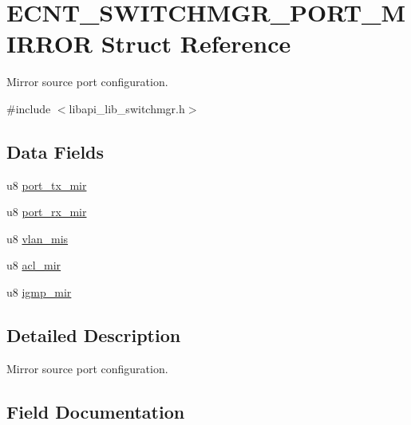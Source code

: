 \hypertarget{structECNT__SWITCHMGR__PORT__MIRROR}{}\section{E\+C\+N\+T\+\_\+\+S\+W\+I\+T\+C\+H\+M\+G\+R\+\_\+\+P\+O\+R\+T\+\_\+\+M\+I\+R\+R\+OR Struct Reference}
\label{structECNT__SWITCHMGR__PORT__MIRROR}


Mirror source port configuration.  




{\ttfamily \#include $<$libapi\+\_\+lib\+\_\+switchmgr.\+h$>$}

\subsection*{Data Fields}
\begin{DoxyCompactItemize}
\item 
u8 \hyperlink{structECNT__SWITCHMGR__PORT__MIRROR_a8ba7e1b38384e254dbbcdc5395e916a3}{port\+\_\+tx\+\_\+mir}
\item 
u8 \hyperlink{structECNT__SWITCHMGR__PORT__MIRROR_a6c1cf20878c16861a9f8cba401745559}{port\+\_\+rx\+\_\+mir}
\item 
u8 \hyperlink{structECNT__SWITCHMGR__PORT__MIRROR_aa485ebcb52416a90ef33f6b2ce2b82f1}{vlan\+\_\+mis}
\item 
u8 \hyperlink{structECNT__SWITCHMGR__PORT__MIRROR_ad4b123ff412d77a1314bb9acd2917a7b}{acl\+\_\+mir}
\item 
u8 \hyperlink{structECNT__SWITCHMGR__PORT__MIRROR_a5e0b73a2657f3f8a8063da754cbf6cf9}{igmp\+\_\+mir}
\end{DoxyCompactItemize}


\subsection{Detailed Description}
Mirror source port configuration. 

\subsection{Field Documentation}
\mbox{\label{structECNT__SWITCHMGR__PORT__MIRROR_ad4b123ff412d77a1314bb9acd2917a7b}} 
